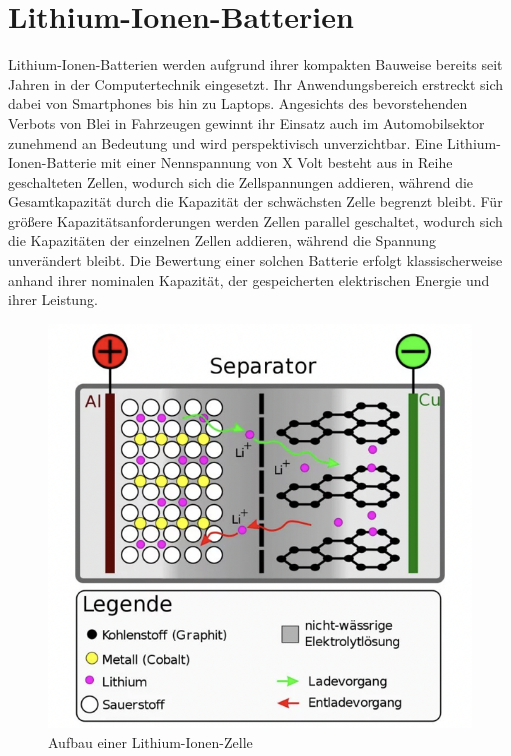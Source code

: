 \section{Lithium-Ionen-Batterien}
Lithium-Ionen-Batterien werden aufgrund ihrer kompakten Bauweise bereits seit Jahren in der Computertechnik eingesetzt. Ihr Anwendungsbereich erstreckt sich dabei von Smartphones bis hin zu Laptops. Angesichts des bevorstehenden Verbots von Blei in Fahrzeugen gewinnt ihr Einsatz auch im Automobilsektor zunehmend an Bedeutung und wird perspektivisch unverzichtbar.\newline
Eine Lithium-Ionen-Batterie mit einer Nennspannung von X Volt besteht aus in Reihe geschalteten Zellen, wodurch sich die Zellspannungen addieren, während die Gesamtkapazität durch die Kapazität der schwächsten Zelle begrenzt bleibt. Für größere Kapazitätsanforderungen werden Zellen parallel geschaltet, wodurch sich die Kapazitäten der einzelnen Zellen addieren, während die Spannung unverändert bleibt. Die Bewertung einer solchen Batterie erfolgt klassischerweise anhand ihrer nominalen Kapazität, der gespeicherten elektrischen Energie und ihrer Leistung.

\begin{figure}
	\centering
	\includegraphics[width=0.7\linewidth]{images/Li-Zelle}
	\caption{Aufbau einer Lithium-Ionen-Zelle}
	\label{fig:li-zelle}
\end{figure}

